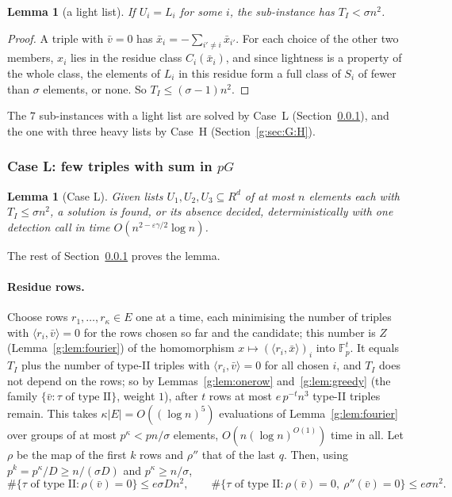 \documentclass[11pt]{article}
\newtheorem{lemma}[theorem]{Lemma}
\theoremstyle{definition}
\theoremstyle{remark}
\newcommand{\Fp}{\mathbb{F}_p}
\newcommand{\eps}{\varepsilon}
\begin{document}
\begin{lemma}[a light list]\label{g:lem:light}
If $U_i=L_i$ for some $i$, the sub-instance has $T_I<\sigma n^2$.
\end{lemma}
\begin{proof}
A triple with $\bar v=0$ has $\bar x_i=-\sum_{i'\ne i}\bar x_{i'}$. For each choice of the other two members, $x_i$ lies in the residue class $C_i(\bar x_i)$, and since lightness is a property of the whole class, the elements of $L_i$ in this residue form a full class of $S_i$ of fewer than $\sigma$ elements, or none. So $T_I\le(\sigma-1)n^2$.
\end{proof}

The $7$ sub-instances with a light list are solved by Case~L (Section~\ref{g:sec:G:L}), and the one with three heavy lists by Case~H (Section~\ref{g:sec:G:H}).

\subsubsection{Case L: few triples with sum in \texorpdfstring{$pG$}{pG}}\label{g:sec:G:L}

\begin{lemma}[Case L]\label{g:lem:partL}
Given lists $U_1,U_2,U_3\subseteq R^d$ of at most $n$ elements each with $T_I\le\sigma n^2$, a solution is found, or its absence decided, deterministically with one detection call in time $O(n^{2-\eps\gamma/2}\log n)$.
\end{lemma}

The rest of Section~\ref{g:sec:G:L} proves the lemma.

\paragraph{Residue rows.} Choose rows $r_1,\dots,r_\kappa\in E$ one at a time, each minimising the number of triples with $\langle r_i,\bar v\rangle=0$ for the rows chosen so far and the candidate; this number is $Z$ (Lemma~\ref{g:lem:fourier}) of the homomorphism $x\mapsto(\langle r_i,\bar x\rangle)_i$ into $\Fp^t$. It equals $T_I$ plus the number of type-II triples with $\langle r_i,\bar v\rangle=0$ for all chosen $i$, and $T_I$ does not depend on the rows; so by Lemmas~\ref{g:lem:onerow} and~\ref{g:lem:greedy} (the family $\{\bar v:\tau\text{ of type II}\}$, weight $1$), after $t$ rows at most $e\,p^{-t}n^3$ type-II triples remain. This takes $\kappa|E|=O((\log n)^5)$ evaluations of Lemma~\ref{g:lem:fourier} over groups of at most $p^\kappa<pn/\sigma$ elements, $O(n(\log n)^{O(1)})$ time in all. Let $\rho$ be the map of the first $k$ rows and $\rho''$ that of the last $q$. Then, using $p^k=p^\kappa/D\ge n/(\sigma D)$ and $p^\kappa\ge n/\sigma$,
\begin{equation}\label{g:eq:resrows}
\#\{\tau\text{ of type II}:\rho(\bar v)=0\}\le e\sigma Dn^2,\qquad\#\{\tau\text{ of type II}:\rho(\bar v)=0,\ \rho''(\bar v)=0\}\le e\sigma n^2 .
\end{equation}
\end{document}

